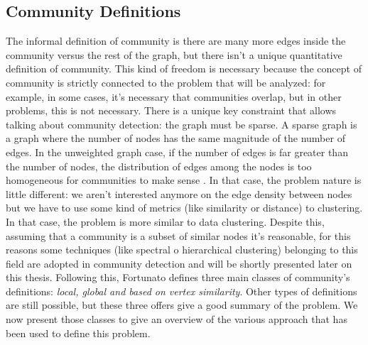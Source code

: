 \subsection{Community Definitions}\label{3.1}
The informal definition of community is there are many more edges inside the community versus the rest of the graph, but there isn't a unique quantitative definition of community. This kind of freedom is necessary because the concept of community is strictly connected to the problem that will be analyzed: for example, in some cases, it's necessary that communities overlap, but in other problems, this is not necessary. There is a unique key constraint that allows talking about community detection: the graph must be sparse. A sparse graph is a graph where the number of nodes has the same magnitude of the number of edges. In the unweighted graph case, if the number of edges is far greater than the number of nodes, the distribution of edges among the nodes is too homogeneous for communities to make sense \cite{fortunato}. In that case, the problem nature is little different: we aren't interested anymore on the edge density between nodes but we have to use some kind of metrics (like similarity or distance) to clustering. In that case, the problem is more similar to data clustering. Despite this, assuming that a community is a subset of similar nodes it's reasonable, for this reasons some techniques (like spectral o hierarchical clustering) belonging to this field are adopted in community detection and will be shortly presented later on this thesis.
Following this, Fortunato \cite{fortunato} defines three main classes of community's definitions: \textit{local, global and based on vertex similarity}. Other types of definitions are still possible, but these three offers give a good summary of the problem. We now present those classes to give an overview of the various approach that has been used to define this problem. 
